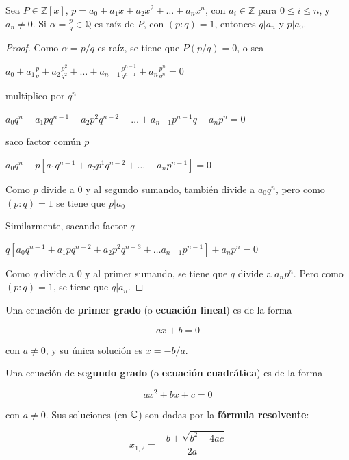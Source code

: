 \begin{theorem}[Gauss] 
Sea $P \in \mathbb{Z}[x]$, $p = a_0 + a_1x + a_2x^2 + \ldots + a_nx^n$, con $a_i \in \mathbb{Z}$ para $0 \leq i \leq n$, y $a_n \neq 0$.  Si $\alpha = \frac{p}{q} \in \mathbb{Q}$ es raíz de $P$, con $(p:q) = 1$, entonces $q | a_n$ y $p | a_0$.
\end{theorem}

\begin{proof}
Como $\alpha = p/q$ es raíz, se tiene que $P(p/q) = 0$, o sea

$a_0 + a_1 \frac{p}{q} + a_2 \frac{p^2}{q^2} + \ldots + a_{n-1} \frac{p^{n-1}}{q^{n-1}} + a_n \frac{p^n}{q^n} = 0$

multiplico por $q^n$

$a_0 q^n + a_1 p q^{n-1} + a_2 p^2 q^{n-2} + \ldots + a_{n-1} p^{n-1} q +  a_n p^n = 0$

saco factor común $p$

$a_0 q^n + p [a_1 q^{n-1} + a_2 p^1 q^{n-2} + \ldots + a_n p^{n-1}] = 0$

Como $p$ divide a $0$ y al segundo sumando, también divide a $a_0 q^n$, pero como $(p:q) = 1$ se tiene que $p | a_0$

Similarmente, sacando factor $q$

$q[a_0 q^{n-1} + a_1 p q^{n-2} + a_2 p^2 q^{n-3} + \ldots a_{n-1} p^{n-1}] + a_n p^n = 0$

Como $q$ divide a $0$ y al primer sumando, se tiene que $q$ divide a $a_n p^n$.  Pero como $(p:q) = 1$, se tiene que $q | a_n$.
\end{proof}

\begin{proposition} 
Una ecuación de \textbf{primer grado} (o \textbf{ecuación lineal}) es de la forma

$$ ax + b = 0 $$

con $a \neq 0$, y su única solución es $x = -b/a$.
\end{proposition}

\begin{proposition} 
Una ecuación de \textbf{segundo grado} (o \textbf{ecuación cuadrática}) es de la forma

$$ ax^2 + bx + c = 0 $$

con $a \neq 0$.  Sus soluciones (en $\mathbb{C}$) son dadas por la \textbf{fórmula resolvente}: \label{formula_resolvente}

$$ x_{1,2} = \frac{-b \pm \sqrt{b^2 - 4ac}}{2a}  $$

\end{proposition}

